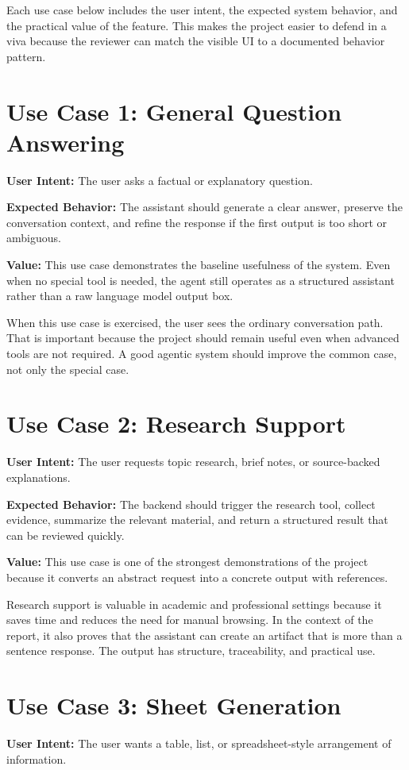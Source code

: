 \documentclass[11pt,oneside]{report}
\begin{document}
Each use case below includes the user intent, the expected system behavior, and the practical value of the feature. This makes the project easier to defend in a viva because the reviewer can match the visible UI to a documented behavior pattern.

\section{Use Case 1: General Question Answering}
\textbf{User Intent:} The user asks a factual or explanatory question.

\textbf{Expected Behavior:} The assistant should generate a clear answer, preserve the conversation context, and refine the response if the first output is too short or ambiguous.

\textbf{Value:} This use case demonstrates the baseline usefulness of the system. Even when no special tool is needed, the agent still operates as a structured assistant rather than a raw language model output box.

When this use case is exercised, the user sees the ordinary conversation path. That is important because the project should remain useful even when advanced tools are not required. A good agentic system should improve the common case, not only the special case.

\section{Use Case 2: Research Support}
\textbf{User Intent:} The user requests topic research, brief notes, or source-backed explanations.

\textbf{Expected Behavior:} The backend should trigger the research tool, collect evidence, summarize the relevant material, and return a structured result that can be reviewed quickly.

\textbf{Value:} This use case is one of the strongest demonstrations of the project because it converts an abstract request into a concrete output with references.

Research support is valuable in academic and professional settings because it saves time and reduces the need for manual browsing. In the context of the report, it also proves that the assistant can create an artifact that is more than a sentence response. The output has structure, traceability, and practical use.

\section{Use Case 3: Sheet Generation}
\textbf{User Intent:} The user wants a table, list, or spreadsheet-style arrangement of information.
\end{document}
